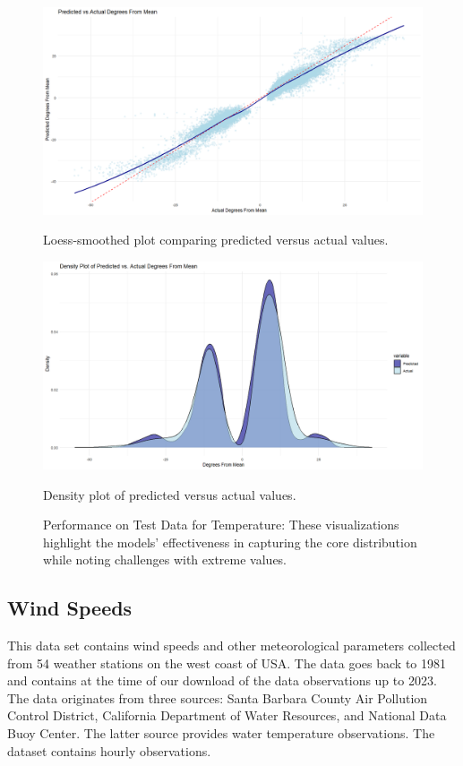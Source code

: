 \documentclass[12pt, twoside,hidelinks]{article}
\theoremstyle{definition}
\numberwithin{equation}{section}
\begin{document}
\begin{figure}[H]
\centering

\includegraphics[width=\textwidth]{visuals/temperature_model_anomalies/final_loess_temp.png}
\caption*{Loess-smoothed plot comparing predicted versus actual values.}
\label{fig:hist_pred_errors}

\includegraphics[width=\textwidth]{visuals/temperature_model_anomalies/final_density_temp.png}
\caption*{Density plot of predicted versus actual values.}
\label{fig:predicted_vs_actual_densities}

\caption{Performance on Test Data for Temperature: These visualizations highlight the models' effectiveness in capturing the core distribution while noting challenges with extreme values.}
\label{fig:test_data_performance_4}
\end{figure}

\subsection{Wind Speeds}\label{sec:analysis:windspeed}

This data set contains wind speeds and other meteorological parameters collected from 54 weather stations on the west coast of USA. The data goes back to 1981 and contains at the time of our download of the data observations up to 2023. The data originates from three sources: Santa Barbara County Air Pollution Control District, California Department of Water Resources, and National Data Buoy Center. The latter source provides water temperature observations. The dataset contains hourly observations.
\end{document}
